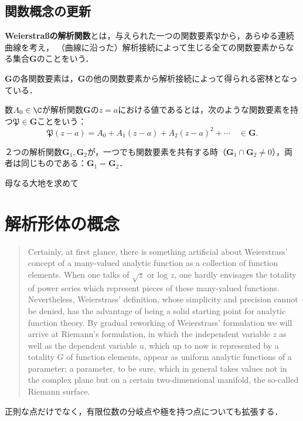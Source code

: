 \documentclass[uplatex, dvipdfmx]{jsreport}
\newcommand{\frakP}{\mathfrak{P}}
\newcommand{\G}{\mathbf{G}}
\begin{document}
\subsection{関数概念の更新}

\begin{definition}
    \textbf{Weierstraßの解析関数}とは，与えられた一つの関数要素$\mathfrak{P}$から，あらゆる連続曲線を考え，
    （曲線に沿った）解析接続によって生じる全ての関数要素からなる集合$\mathbf{G}$のことをいう．
\end{definition}
\begin{remark}
    $\mathbf{G}$の各関数要素は，$\mathbf{G}$の他の関数要素から解析接続によって得られる密林となっている．
\end{remark}

\begin{definition}[value]
    数$A_0\in\C$が解析関数$\G$の$z=a$における値であるとは，次のような関数要素を持つ$\frakP\in\G$ことをいう：
    \[\frakP(z-a)=A_0+A_1(z-a)+A_2(z-a)^2+\cdots\quad\in\G.\]
\end{definition}

\begin{proposition}[極大性]
    ２つの解析関数$\mathbf{G}_1,\G_2$が，一つでも関数要素を共有する時（$\G_1\cap\G_2\ne 0$），両者は同じものである：$\G_1=\G_2$．
\end{proposition}

\begin{itembox}[l]{母なる大地を求めて}
    
\end{itembox}

\section{解析形体の概念}

\begin{screen}
    \begin{quote}
        Certainly, at first glance, there is something artificial about Weierstrass' concept of a many-valued analytic function as a collection of function elements.
        When one talks of $\sqrt{z}$ or log $z$, one hardly envisages the totality of power series which represent pieces of these many-valued functions.
        Nevertheless, Weierstrass' definition, whose simplicity and precision cannot be denied, has the advantage of being a solid starting point for analytic function theory.
        By gradual reworking of Weierstrass' formulation we will arrive at Riemann's formulation, in which the independent variable $z$ as well as the dependent variable $u$, which up to now is represented by a totality $G$ of function elements, appear as uniform analytic functions of a parameter; a parameter, to be sure, which in general takes values not in the complex plane but on a certain two-dimensional manifold, the so-called Riemann surface.
    \end{quote}
    正則な点だけでなく，有限位数の分岐点や極を持つ点についても拡張する．
\end{screen}
\end{document}
